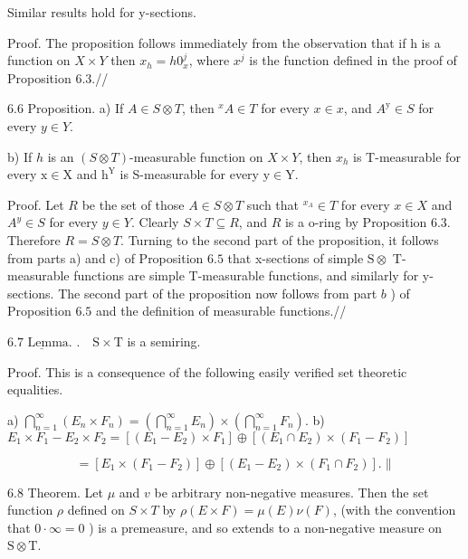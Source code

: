 {Similar results hold for y-sections.

Proof. The proposition follows immediately from the observation that if $\mathrm{h}$ is a function on $X \times Y$ then $x_{h}=h 0_{x}^{j}$, where $x^{j}$ is the function defined in the proof of Proposition 6.3.//

6.6 Proposition. a) If $A \in S \otimes T$, then ${ }^{x} A \in T$ for every $x \in x$, and $A^{\mathrm{y}} \in S$ for every $y \in Y$.

b) If $h$ is an $(S \otimes T)$-measurable function on $X \times Y$, then $x_{h}$ is T-measurable for every $\mathrm{x} \in \mathrm{X}$ and $\mathrm{h}^{\mathrm{Y}}$ is S-measurable for every $\mathrm{y} \in \mathrm{Y}$.

Proof. Let $R$ be the set of those $A \in S \otimes T$ such that ${ }^{x_{A}} \in T$ for every $x \in X$ and $A^{y} \in S$ for every $y \in Y$. Clearly $S \times T \subseteq R$, and $R$ is a o-ring by Proposition 6.3. Therefore $R=S \otimes T$. Turning to the second part of the proposition, it follows from parts a) and c) of Proposition $6.5$ that x-sections of simple $\mathrm{S} \otimes$ T-measurable functions are simple T-measurable functions, and similarly for y-sections. The second part of the proposition now follows from part $b$ ) of Proposition $6.5$ and the definition of measurable functions.//

$\underline{6.7 \text { Lemma. }} . \quad \mathrm{S} \times \mathrm{T}$ is a semiring.

Proof. This is a consequence of the following easily verified set theoretic equalities.

a) $\bigcap_{n=1}^{\infty}\left(E_{n} \times F_{n}\right)=\left(\bigcap_{n=1}^{\infty} E_{n}\right) \times\left(\bigcap_{n=1}^{\infty} F_{n}\right)$. b) $E_{1} \times F_{1}-E_{2} \times F_{2}=\left[\left(E_{1}-E_{2}\right) \times F_{1}\right] \oplus\left[\left(E_{1} \cap E_{2}\right) \times\left(F_{1}-F_{2}\right)\right]$

$$
=\left[E_{1} \times\left(F_{1}-F_{2}\right)\right] \oplus\left[\left(E_{1}-E_{2}\right) \times\left(F_{1} \cap F_{2}\right)\right] . \|
$$

$6.8$ Theorem. Let $\mu$ and $v$ be arbitrary non-negative measures. Then the set function $\rho$ defined on $S \times T$ by $\rho(E \times F)=\mu(E) \nu(F)$, (with the convention that $0 \cdot \infty=0$ ) is a premeasure, and so extends to a non-negative measure on $\mathrm{S} \otimes \mathrm{T}$.

}
